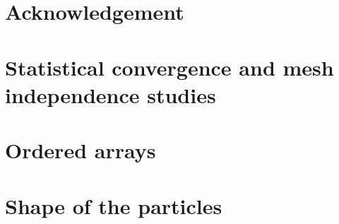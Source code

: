 \documentclass[12pt]{My_preprint}
\begin{document}
\section*{Acknowledgement}

\appendix
%
\section{Statistical convergence and mesh independence studies}

\section{Ordered arrays}

\section{Shape of the particles}
\label{app:shape}



\end{document}
